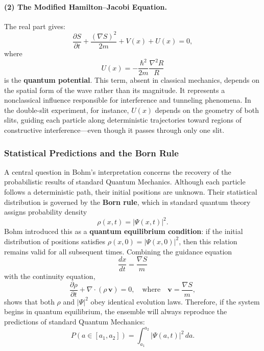 \paragraph{(2) The Modified Hamilton–Jacobi Equation.}
The real part gives:
\begin{equation}
\frac{\partial S}{\partial t} + \frac{(\nabla S)^2}{2m} + V(x) + U(x) = 0,
\end{equation}
where
\begin{equation}
U(x) = -\frac{\hbar^2}{2m}\frac{\nabla^2 R}{R}
\end{equation}
is the \textbf{quantum potential}.  
This term, absent in classical mechanics, depends on the spatial form of the wave rather than its magnitude.  
It represents a nonclassical influence responsible for interference and tunneling phenomena.  
In the double-slit experiment, for instance, $U(x)$ depends on the geometry of both slits, guiding each particle along deterministic trajectories toward regions of constructive interference—even though it passes through only one slit.

\subsubsection{Statistical Predictions and the Born Rule}

A central question in Bohm’s interpretation concerns the recovery of the probabilistic results of standard Quantum Mechanics.  
Although each particle follows a deterministic path, their initial positions are unknown.  
Their statistical distribution is governed by the \textbf{Born rule}, which in standard quantum theory assigns probability density
\begin{equation}
\rho(x,t) = |\Psi(x,t)|^2.
\end{equation}
Bohm introduced this as a \textbf{quantum equilibrium condition}: if the initial distribution of positions satisfies $\rho(x,0) = |\Psi(x,0)|^2$, then this relation remains valid for all subsequent times.  
Combining the guidance equation
\[
\frac{dx}{dt} = \frac{\nabla S}{m}
\]
with the continuity equation,
\[
\frac{\partial \rho}{\partial t} + \nabla \cdot (\rho\, \mathbf{v}) = 0,
\quad \text{where} \quad \mathbf{v} = \frac{\nabla S}{m},
\]
shows that both $\rho$ and $|\Psi|^2$ obey identical evolution laws.  
Therefore, if the system begins in quantum equilibrium, the ensemble will always reproduce the predictions of standard Quantum Mechanics:
\[
P(a \in [a_1,a_2]) = \int_{a_1}^{a_2} |\Psi(a,t)|^2\, da.
\]

